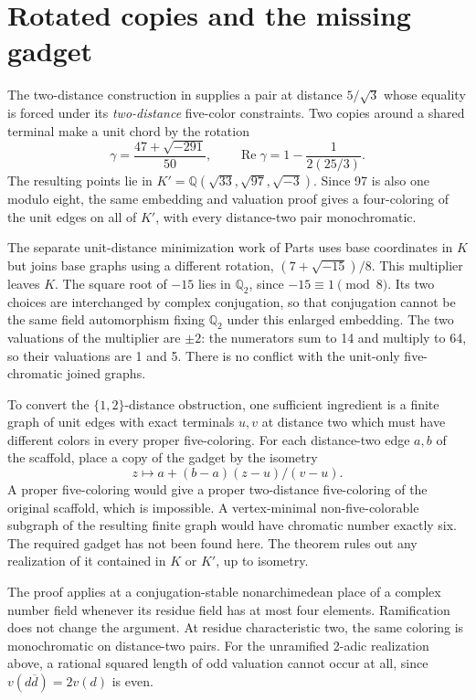 \documentclass[11pt,letterpaper]{article}
\begin{document}
\section{Rotated copies and the missing gadget}
The two-distance construction in \cite[\S3]{parts-two} supplies a
pair at distance \(5/\sqrt3\) whose equality is forced under its
\emph{two-distance} five-color constraints. Two copies around a
shared terminal make a unit chord by the rotation
\[
 \gamma=\frac{47+\sqrt{-291}}{50},
 \qquad \operatorname{Re}\gamma=1-\frac{1}{2(25/3)}.
\]
The resulting points lie in
\(K'=\mathbb Q(\sqrt{33},\sqrt{97},\sqrt{-3})\). Since 97 is also
one modulo eight, the same embedding and valuation proof gives a
four-coloring of the unit edges on all of \(K'\), with every
distance-two pair monochromatic.

The separate unit-distance minimization work of Parts
\cite[\S\S2,4]{parts-unit} uses base coordinates in \(K\) but
joins base graphs using a different rotation,
\((7+\sqrt{-15})/8\). This multiplier leaves \(K\). The square
root of \(-15\) lies in \(\mathbb Q_2\), since \(-15\equiv1\pmod8\).
Its two choices are interchanged by complex conjugation, so that
conjugation cannot be the same field automorphism fixing
\(\mathbb Q_2\) under this enlarged embedding. The two valuations
of the multiplier are \(\pm2\): the numerators sum to 14 and
multiply to 64, so their valuations are 1 and 5. There is no
conflict with the unit-only five-chromatic joined graphs.

To convert the \(\{1,2\}\)-distance obstruction, one sufficient
ingredient is a finite graph of unit edges with exact terminals
\(u,v\) at distance two which must have different colors in every
proper five-coloring. For each distance-two edge \(a,b\) of the
scaffold, place a copy of the gadget by the isometry
\[
 z\longmapsto a+(b-a)(z-u)/(v-u).
\]
A proper five-coloring would give a proper two-distance
five-coloring of the original scaffold, which is impossible.
A vertex-minimal non-five-colorable subgraph of the resulting
finite graph would have chromatic number exactly six. The
required gadget has not been found here. The theorem rules out
any realization of it contained in \(K\) or \(K'\), up to isometry.

The proof applies at a conjugation-stable nonarchimedean place of
a complex number field whenever its residue field has at most
four elements. Ramification does not change the argument. At
residue characteristic two, the same coloring is monochromatic
on distance-two pairs. For the unramified 2-adic realization
above, a rational squared length of odd valuation cannot occur
at all, since \(v(d\overline d)=2v(d)\) is even.
\end{document}
